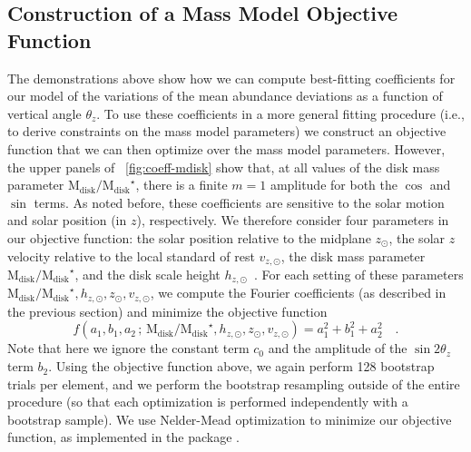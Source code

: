 \documentclass[modern]{aastex63}
\newcommand{\mdisk}{\ensuremath{\mathrm{M}_\mathrm{disk}}}
\newcommand{\mratio}{\ensuremath{\mdisk / \mdisk^\star}}
\newcommand{\hz}{\ensuremath{h_{z, \odot}}}
\newcommand{\zsun}{\ensuremath{z_\odot}}
\newcommand{\vzsun}{\ensuremath{v_{z, \odot}}}
\begin{document}
\subsection{Construction of a Mass Model Objective Function}
\label{sec:objective-func}

The demonstrations above show how we can compute best-fitting coefficients for
our model of the variations of the mean abundance deviations as a function of
vertical angle $\theta_z$.
To use these coefficients in a more general fitting procedure (i.e., to derive
constraints on the mass model parameters) we construct an objective function
that we can then optimize over the mass model parameters.
However, the upper panels of \figurename~\ref{fig:coeff-mdisk} show that, at all
values of the disk mass parameter \mratio, there is a finite $m=1$ amplitude for
both the $\cos$ and $\sin$ terms.
As noted before, these coefficients are sensitive to the solar motion and solar
position (in $z$), respectively.
We therefore consider four parameters in our objective function: the solar
position relative to the midplane \zsun, the solar $z$ velocity relative to the
local standard of rest \vzsun, the disk mass parameter \mratio, and the disk
scale height \hz\ \citep[the Miyamoto--Nagai scale height parameter, not an
exponential scale height;][]{Miyamoto:1975}.
For each setting of these parameters $\mratio, \hz, \zsun, \vzsun$, we compute
the Fourier coefficients (as described in the previous section) and minimize the
objective function
\begin{equation}
  f(a_1, b_1, a_2 \,;\, \mratio, \hz, \zsun, \vzsun) =
    a_1^2 + b_1^2 + a_2^2 \quad . \label{eq:objective}
\end{equation}
Note that here we ignore the constant term $c_0$ and the amplitude of the $\sin
2\theta_z$ term $b_2$.
Using the objective function above, we again perform 128 bootstrap trials per
element, and we perform the bootstrap resampling outside of the entire procedure
(so that each optimization is performed independently with a bootstrap sample).
We use Nelder-Mead optimization \citep{Gao:2012} to minimize our objective
function, as implemented in the  package \citep{Virtanen:2020}.
\end{document}
